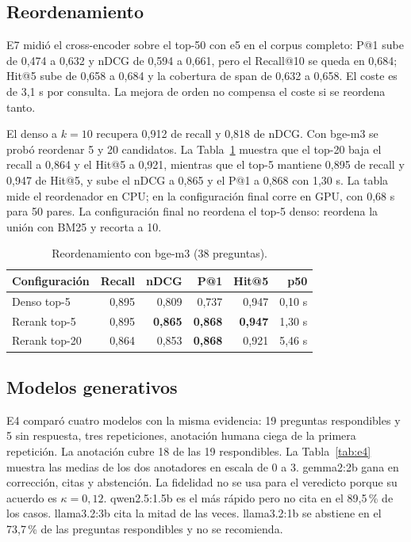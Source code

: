 \subsection{Reordenamiento}

E7 midi\'o el cross-encoder sobre el top-50 con e5 en el corpus completo: P@1 sube de 0,474 a 0,632 y nDCG de 0,594 a 0,661, pero el Recall@10 se queda en 0,684; Hit@5 sube de 0,658 a 0,684 y la cobertura de span de 0,632 a 0,658. El coste es de 3,1 s por consulta. La mejora de orden no compensa el coste si se reordena tanto.

El denso a $k=10$ recupera 0,912 de recall y 0,818 de nDCG. Con bge-m3 se prob\'o reordenar 5 y 20 candidatos. La Tabla~\ref{tab:rerank} muestra que el top-20 baja el recall a 0,864 y el Hit@5 a 0,921, mientras que el top-5 mantiene 0,895 de recall y 0,947 de Hit@5, y sube el nDCG a 0,865 y el P@1 a 0,868 con 1,30 s. La tabla mide el reordenador en CPU; en la configuraci\'on final corre en GPU, con 0,68 s para 50 pares. La configuraci\'on final no reordena el top-5 denso: reordena la uni\'on con BM25 y recorta a 10.

\begin{table}[t]
\centering
\footnotesize
\caption{Reordenamiento con bge-m3 (38 preguntas).}
\label{tab:rerank}
\begin{tabular}{lrrrrr}
\toprule
Configuraci\'on & Recall & nDCG & P@1 & Hit@5 & p50 \\
\midrule
Denso top-5 & 0,895 & 0,809 & 0,737 & 0,947 & 0,10 s \\
Rerank top-5 & 0,895 & \textbf{0,865} & \textbf{0,868} & \textbf{0,947} & 1,30 s \\
Rerank top-20 & 0,864 & 0,853 & \textbf{0,868} & 0,921 & 5,46 s \\
\bottomrule
\end{tabular}
\end{table}


\subsection{Modelos generativos}

E4 compar\'o cuatro modelos con la misma evidencia: 19 preguntas respondibles y 5 sin respuesta, tres repeticiones, anotaci\'on humana ciega de la primera repetici\'on. La anotaci\'on cubre 18 de las 19 respondibles. La Tabla~\ref{tab:e4} muestra las medias de los dos anotadores en escala de 0 a 3. gemma2:2b gana en correcci\'on, citas y abstenci\'on. La fidelidad no se usa para el veredicto porque su acuerdo es $\kappa=0,12$. qwen2.5:1.5b es el m\'as r\'apido pero no cita en el 89,5\,\% de los casos. llama3.2:3b cita la mitad de las veces. llama3.2:1b se abstiene en el 73,7\,\% de las preguntas respondibles y no se recomienda.

